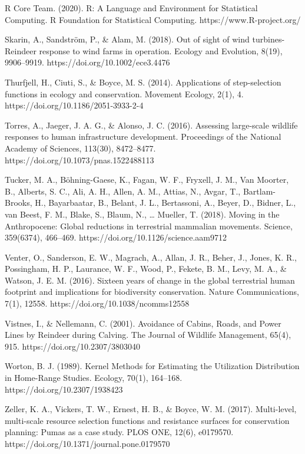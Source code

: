 \documentclass[titlepage]{article}
\begin{document}
R Core Team. (2020). R: A Language and Environment for Statistical Computing. R Foundation for Statistical Computing. https://www.R-project.org/

Skarin, A., Sandström, P., & Alam, M. (2018). Out of sight of wind turbines-Reindeer response to wind farms in operation. Ecology and Evolution, 8(19), 9906–9919. https://doi.org/10.1002/ece3.4476

Thurfjell, H., Ciuti, S., & Boyce, M. S. (2014). Applications of step-selection functions in ecology and conservation. Movement Ecology, 2(1), 4. https://doi.org/10.1186/2051-3933-2-4

Torres, A., Jaeger, J. A. G., & Alonso, J. C. (2016). Assessing large-scale wildlife responses to human infrastructure development. Proceedings of the National Academy of Sciences, 113(30), 8472–8477. https://doi.org/10.1073/pnas.1522488113

Tucker, M. A., Böhning-Gaese, K., Fagan, W. F., Fryxell, J. M., Van Moorter, B., Alberts, S. C., Ali, A. H., Allen, A. M., Attias, N., Avgar, T., Bartlam-Brooks, H., Bayarbaatar, B., Belant, J. L., Bertassoni, A., Beyer, D., Bidner, L., van Beest, F. M., Blake, S., Blaum, N., … Mueller, T. (2018). Moving in the Anthropocene: Global reductions in terrestrial mammalian movements. Science, 359(6374), 466–469. https://doi.org/10.1126/science.aam9712

Venter, O., Sanderson, E. W., Magrach, A., Allan, J. R., Beher, J., Jones, K. R., Possingham, H. P., Laurance, W. F., Wood, P., Fekete, B. M., Levy, M. A., & Watson, J. E. M. (2016). Sixteen years of change in the global terrestrial human footprint and implications for biodiversity conservation. Nature Communications, 7(1), 12558. https://doi.org/10.1038/ncomms12558

Vistnes, I., & Nellemann, C. (2001). Avoidance of Cabins, Roads, and Power Lines by Reindeer during Calving. The Journal of Wildlife Management, 65(4), 915. https://doi.org/10.2307/3803040

Worton, B. J. (1989). Kernel Methods for Estimating the Utilization Distribution in Home-Range Studies. Ecology, 70(1), 164–168. https://doi.org/10.2307/1938423

Zeller, K. A., Vickers, T. W., Ernest, H. B., & Boyce, W. M. (2017). Multi-level, multi-scale resource selection functions and resistance surfaces for conservation planning: Pumas as a case study. PLOS ONE, 12(6), e0179570. https://doi.org/10.1371/journal.pone.0179570
\end{document}
